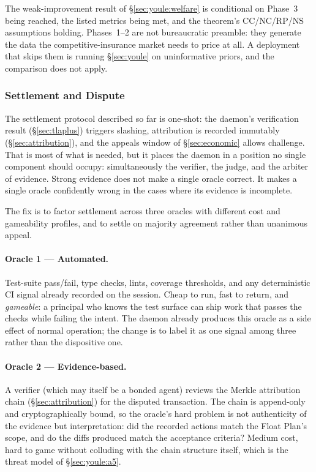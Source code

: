 \documentclass[11pt,a4paper]{article}
\theoremstyle{definition}
\theoremstyle{remark}
\begin{document}
\medskip

The weak-improvement result of \S\ref{sec:youle:welfare} is conditional on Phase~3 being reached, the listed metrics being met, and the theorem's CC/NC/RP/NS assumptions holding. Phases~1--2 are not bureaucratic preamble: they generate the data the competitive-insurance market needs to price at all. A deployment that skips them is running \S\ref{sec:youle} on uninformative priors, and the comparison does not apply.

\subsubsection{Settlement and Dispute}\label{sec:pricing:settlement}

The settlement protocol described so far is one-shot: the daemon's verification result (\S\ref{sec:tlaplus}) triggers slashing, attribution is recorded immutably (\S\ref{sec:attribution}), and the appeals window of \S\ref{sec:economic} allows challenge. That is most of what is needed, but it places the daemon in a position no single component should occupy: simultaneously the verifier, the judge, and the arbiter of evidence. Strong evidence does not make a single oracle correct. It makes a single oracle confidently wrong in the cases where its evidence is incomplete.

The fix is to factor settlement across three oracles with different cost and gameability profiles, and to settle on majority agreement rather than unanimous appeal.

\paragraph{Oracle 1 --- Automated.}
Test-suite pass/fail, type checks, lints, coverage thresholds, and any deterministic CI signal already recorded on the session. Cheap to run, fast to return, and \emph{gameable}: a principal who knows the test surface can ship work that passes the checks while failing the intent. The daemon already produces this oracle as a side effect of normal operation; the change is to label it as one signal among three rather than the dispositive one.

\paragraph{Oracle 2 --- Evidence-based.}
A verifier (which may itself be a bonded agent) reviews the Merkle attribution chain (\S\ref{sec:attribution}) for the disputed transaction. The chain is append-only and cryptographically bound, so the oracle's hard problem is not authenticity of the evidence but interpretation: did the recorded actions match the Float Plan's scope, and do the diffs produced match the acceptance criteria? Medium cost, hard to game without colluding with the chain structure itself, which is the threat model of \S\ref{sec:youle:a5}.
\end{document}
